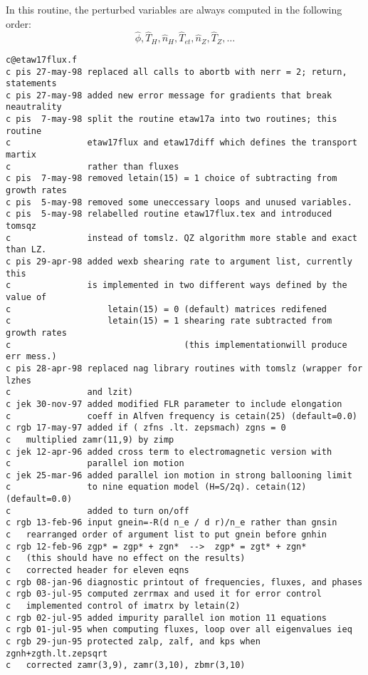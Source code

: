   
In this routine, the perturbed variables are always computed in
the following order:
\[ \hat{\phi}, \hat{T}_H, \hat{n}_H, \hat{T}_{et},
    \hat{n}_Z, \hat{T}_Z, \ldots \]


\begin{verbatim}
c@etaw17flux.f
c pis 27-may-98 replaced all calls to abortb with nerr = 2; return, statements
c pis 27-may-98 added new error message for gradients that break neautrality
c pis  7-may-98 split the routine etaw17a into two routines; this routine
c               etaw17flux and etaw17diff which defines the transport martix
c               rather than fluxes
c pis  7-may-98 removed letain(15) = 1 choice of subtracting from growth rates
c pis  5-may-98 removed some uneccessary loops and unused variables.
c pis  5-may-98 relabelled routine etaw17flux.tex and introduced tomsqz 
c               instead of tomslz. QZ algorithm more stable and exact than LZ.
c pis 29-apr-98 added wexb shearing rate to argument list, currently this
c               is implemented in two different ways defined by the value of 
c                   letain(15) = 0 (default) matrices redifened
c                   letain(15) = 1 shearing rate subtracted from growth rates
c                                  (this implementationwill produce err mess.)
c pis 28-apr-98 replaced nag library routines with tomslz (wrapper for lzhes
c               and lzit)
c jek 30-nov-97 added modified FLR parameter to include elongation
c               coeff in Alfven frequency is cetain(25) (default=0.0)
c rgb 17-may-97 added if ( zfns .lt. zepsmach) zgns = 0
c   multiplied zamr(11,9) by zimp
c jek 12-apr-96 added cross term to electromagnetic version with
c               parallel ion motion
c jek 25-mar-96 added parallel ion motion in strong ballooning limit
c               to nine equation model (H=S/2q). cetain(12) (default=0.0)
c               added to turn on/off
c rgb 13-feb-96 input gnein=-R(d n_e / d r)/n_e rather than gnsin
c   rearranged order of argument list to put gnein before gnhin
c rgb 12-feb-96 zgp* = zgp* + zgn*  -->  zgp* = zgt* + zgn*
c   (this should have no effect on the results)
c   corrected header for eleven eqns
c rgb 08-jan-96 diagnostic printout of frequencies, fluxes, and phases
c rgb 03-jul-95 computed zerrmax and used it for error control
c   implemented control of imatrx by letain(2)
c rgb 02-jul-95 added impurity parallel ion motion 11 equations
c rgb 01-jul-95 when computing fluxes, loop over all eigenvalues ieq
c rgb 29-jun-95 protected zalp, zalf, and kps when zgnh+zgth.lt.zepsqrt
c   corrected zamr(3,9), zamr(3,10), zbmr(3,10)

\end{verbatim}

